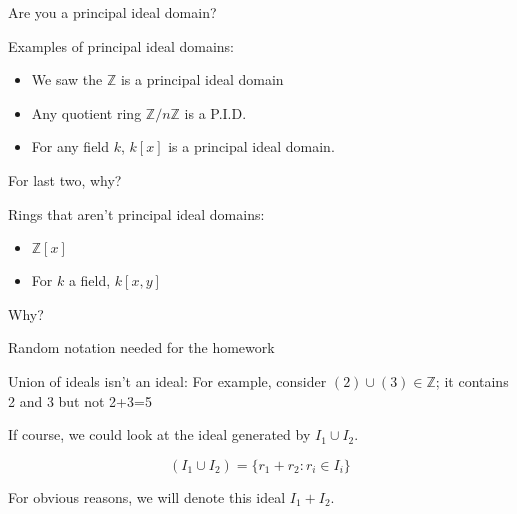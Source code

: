 \documentclass{beamer}
\begin{document}
\begin{frame}{Are you a principal ideal domain?}

\begin{block}{Examples of principal ideal domains:}
\begin{itemize}
\item We saw the $\mathbb{Z}$ is a principal ideal domain
\item Any quotient ring $\mathbb{Z}/n\mathbb{Z}$ is a P.I.D.
\item For any field $k$, $k[x]$ is a principal ideal domain.
\end{itemize}
For last two, why?
\end{block}

\begin{block}{Rings that aren't principal ideal domains:}
\begin{itemize}
\item $\mathbb{Z}[x]$
\item For $k$ a field, $k[x,y]$
\end{itemize}
Why?
\end{block}


\end{frame}


\begin{frame}{Random notation needed for the homework}

\begin{block}{Union of ideals isn't an ideal:}
For example, consider $(2)\cup (3) \in \mathbb{Z}$; it contains 2 and 3 but not 2+3=5
\end{block}

If course, we could look at the ideal generated by $I_1\cup I_2$.

\begin{lemma} 
$$(I_1\cup I_2)=\{r_1+r_2 : r_i\in I_i\}$$
\end{lemma}

For obvious reasons, we will denote this ideal $I_1+I_2$.

\end{frame}
\end{document}
